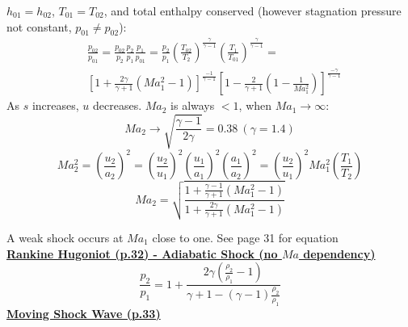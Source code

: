 \documentclass[8pt, landscape, fleqn]{scrartcl}
\begin{document}
\begin{multicols*}{3}
$h_{01} = h_{02}$, $T_{01} = T_{02}$, and total enthalpy conserved (however stagnation pressure not constant, $p_{01}\neq p_{02}$):
\begin{align*}
    &\frac{p_{02}}{p_{01}} = \frac{p_{02}}{p_{2}} \frac{p_2}{p_1} \frac{p_1}{p_{01}} = \frac{p_2}{p_1} \left( \frac{T_{02}}{T_2} \right)^{\frac{\gamma}{\gamma-1}}\left(\frac{T_1}{T_{01}}\right)^{\frac{\gamma}{\gamma-1}} = \\
    & \left[ 1 + \frac{2 \gamma}{\gamma + 1} (Ma_1^2 -1)\right]^{\frac{-1}{\gamma-1}} \left[1- \frac{2}{\gamma+1} \left( 1-\frac{1}{Ma_1^2}\right)\right]^{\frac{-\gamma}{\gamma-1}} 
\end{align*}
As $s$ increases, $u$ decreases. $Ma_2$ is always $<1$, when $Ma_1 \rightarrow \infty$:
\begin{equation*}
    Ma_2 \rightarrow \sqrt{\frac{\gamma-1}{2\gamma}} = 0.38 ~ (\gamma = 1.4)
\end{equation*}
\begin{equation*}
    Ma_2^2 = \left( \frac{u_2}{a_2}\right)^2 = \left( \frac{u_2}{u_1}\right)^2 \left( \frac{u_1}{a_1}\right)^2 \left( \frac{a_1}{a_2}\right)^2 = \left( \frac{u_2}{u_1}\right)^2 Ma_1^2 \left( \frac{T_1}{T_2}\right)
\end{equation*}
\begin{equation*}
    Ma_2 = \sqrt{\frac{1 + \frac{\gamma -1}{\gamma + 1} \left( Ma_1^2 -1\right)}{1 + \frac{2\gamma}{\gamma + 1}\left( Ma_1^2 - 1\right)}}
\end{equation*}

A weak shock occurs at $Ma_1$ close to one. See page 31 for equation \\

\underline{\textbf{Rankine Hugoniot (p.32) - Adiabatic Shock (no $Ma$ dependency)}}
\begin{equation*}
    \frac{p_2}{p_1} = 1 + \frac{2 \gamma \left( \frac{\rho_2}{\rho_1}-1\right)}{\gamma + 1 - (\gamma -1)\frac{\rho_2}{\rho_1}}
\end{equation*} 
\underline{\textbf{Moving Shock Wave (p.33)}}


\end{multicols*}
\end{document}
